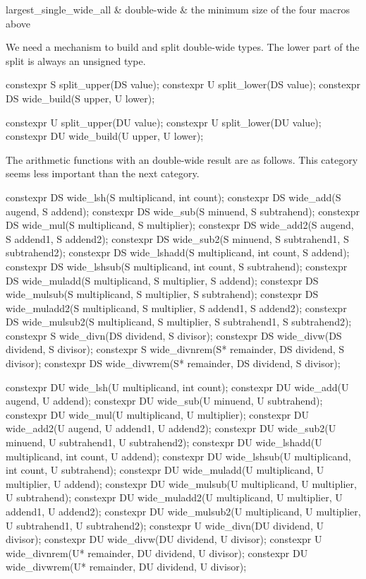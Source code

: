 \begin{addedblock}
\begin{libreqtab3}
largest_single_wide_all & double-wide & the minimum size of the four macros above
\\ \rowsep

\end{libreqtab3}

We need a mechanism to build and split double-wide types. The lower part of the split is always an unsigned type.

\begin{itemdecl}
constexpr S split_upper(DS value);
constexpr U split_lower(DS value);
constexpr DS wide_build(S upper, U lower);

constexpr U split_upper(DU value);
constexpr U split_lower(DU value);
constexpr DU wide_build(U upper, U lower);
\end{itemdecl}

The arithmetic functions with an double-wide result are as follows. This category seems less important than the next category.

\begin{itemdecl}
constexpr DS wide_lsh(S multiplicand, int count);
constexpr DS wide_add(S augend, S addend);
constexpr DS wide_sub(S minuend, S subtrahend);
constexpr DS wide_mul(S multiplicand, S multiplier);
constexpr DS wide_add2(S augend, S addend1, S addend2);
constexpr DS wide_sub2(S minuend, S subtrahend1, S subtrahend2);
constexpr DS wide_lshadd(S multiplicand, int count, S addend);
constexpr DS wide_lshsub(S multiplicand, int count, S subtrahend);
constexpr DS wide_muladd(S multiplicand, S multiplier, S addend);
constexpr DS wide_mulsub(S multiplicand, S multiplier, S subtrahend);
constexpr DS wide_muladd2(S multiplicand, S multiplier, S addend1, S addend2);
constexpr DS wide_mulsub2(S multiplicand, S multiplier, S subtrahend1, S subtrahend2);
constexpr S wide_divn(DS dividend, S divisor);
constexpr DS wide_divw(DS dividend, S divisor);
constexpr S wide_divnrem(S* remainder, DS dividend, S divisor);
constexpr DS wide_divwrem(S* remainder, DS dividend, S divisor);

constexpr DU wide_lsh(U multiplicand, int count);
constexpr DU wide_add(U augend, U addend);
constexpr DU wide_sub(U minuend, U subtrahend);
constexpr DU wide_mul(U multiplicand, U multiplier);
constexpr DU wide_add2(U augend, U addend1, U addend2);
constexpr DU wide_sub2(U minuend, U subtrahend1, U subtrahend2);
constexpr DU wide_lshadd(U multiplicand, int count, U addend);
constexpr DU wide_lshsub(U multiplicand, int count, U subtrahend);
constexpr DU wide_muladd(U multiplicand, U multiplier, U addend);
constexpr DU wide_mulsub(U multiplicand, U multiplier, U subtrahend);
constexpr DU wide_muladd2(U multiplicand, U multiplier, U addend1, U addend2);
constexpr DU wide_mulsub2(U multiplicand, U multiplier, U subtrahend1, U subtrahend2);
constexpr U wide_divn(DU dividend, U divisor);
constexpr DU wide_divw(DU dividend, U divisor);
constexpr U wide_divnrem(U* remainder, DU dividend, U divisor);
constexpr DU wide_divwrem(U* remainder, DU dividend, U divisor);
\end{itemdecl}


\end{addedblock}
